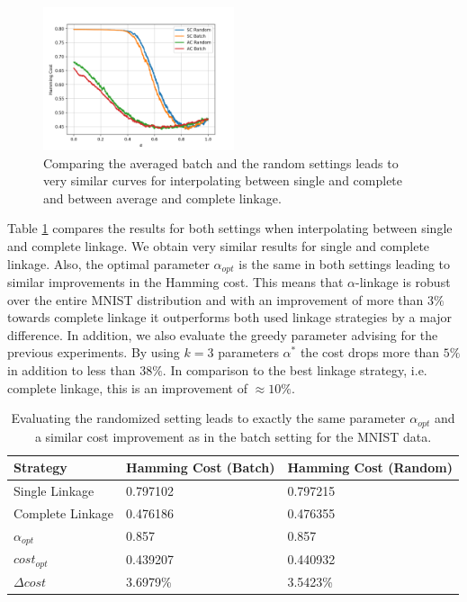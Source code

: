 \begin{figure}[h]
    \centering
    \includegraphics[width=0.5\textwidth]{plots/mnist_1000.png}
    \caption{Comparing the averaged batch and the random settings leads to very similar curves for interpolating between single and complete and between average and complete linkage.}
    \label{fig:mnistscrandom}
\end{figure}

Table \ref{table:mnist1000randomsc} compares the results for both settings when interpolating between single and complete linkage. We obtain very similar results for single and complete linkage. Also, the optimal parameter $\alpha_{opt}$ is the same in both settings leading to similar improvements in the Hamming cost. This means that $\alpha$-linkage is robust over the entire MNIST distribution and with an improvement of more than $3\%$ towards complete linkage it outperforms both used linkage strategies by a major difference. In addition, we also evaluate the greedy parameter advising for the previous experiments. By using $k = 3$ parameters $\alpha^*$ the cost drops more than $5\%$ in addition to less than $38\%$. In comparison to the best linkage strategy, i.e. complete linkage, this is an improvement of $\approx 10\%$.

\begin{table}[H]
    \centering
    \begin{tabular}{|l | l | l |}
    \hline
    Strategy & Hamming Cost (Batch) & Hamming Cost (Random)\\ \hline
    Single Linkage & 0.797102 & 0.797215\\
    Complete Linkage & 0.476186 & 0.476355\\
    $\alpha_{opt}$ & 0.857 & 0.857\\
    $cost_{opt}$ & 0.439207 & 0.440932\\
    $\Delta cost$ & 3.6979\% & 3.5423\%\\\hline
    \end{tabular}
    \caption{Evaluating the randomized setting leads to exactly the same parameter $\alpha_{opt}$ and a similar cost improvement as in the batch setting for the MNIST data.}
    \label{table:mnist1000randomsc}
\end{table}

